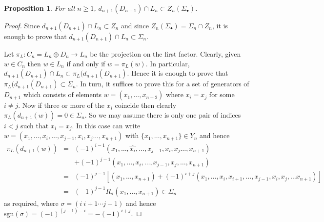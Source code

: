 \documentclass[12pt]{amsart}
\newtheorem{prop}[lem]{Proposition}
\theoremstyle{definition}
\newcommand{\<}{\langle}
\renewcommand{\>}{\rangle}
\newcommand{\sgn}[1]{\mathrm{sgn}(#1)}
\renewcommand{\sgn}[1]{\mathrm{sgn}(#1)}
\begin{document}
\begin{prop}\label{prop:symm} 
 For all $n\geq 1$, $d_{n+1}(D_{n+1})\cap L_n\subset Z_n(\Sigma_\bullet)$.
\end{prop}

\begin{proof} 
Since $d_{n+1}(D_{n+1})\cap L_n\subset Z_n$ and since $Z_n(\Sigma_\bullet)=\Sigma_n\cap Z_n$, it is enough to prove that $d_{n+1}(D_{n+1})\cap L_n\subset \Sigma_n$. 

Let $\pi_L:C_n=L_n\oplus D_n\to L_n$ be the projection on the first factor. Clearly, given $w\in C_n$ then $w\in L_n$ if and only if $w=\pi_L(w)$. In particular, 
$d_{n+1}(D_{n+1})\cap L_n\subset \pi_L(d_{n+1}(D_{n+1})$. Hence it is enough to prove that $\pi_L(d_{n+1}(D_{n+1})\subset \Sigma_n$. In turn, it suffices to  prove this for a set of generators of $D_{n+1}$ which consists of elements $w=(x_1,\ldots,x_{n+2})$ where $x_i=x_j$ for some $i\not=j$. Now if three or more of the $x_i$ coincide then clearly 
$\pi_L(d_{n+1}(w))=0\in \Sigma_n$. So we may assume there is only one pair of indices $i<j$ such that $x_i=x_j$. In this case can write $w=(x_1,\ldots,x_i,\ldots, x_{j-1},x_i,x_j\ldots,x_{n+1})$ with $\{x_1,\ldots,x_{n+1}\}\in Y_n$ and hence 
\begin{eqnarray*}
\pi_L(d_{n+1}(w))&=& (-1)^{i-1}(x_1,\ldots,\hat{x_i},\ldots, x_{j-1},x_i,x_j\ldots ,x_{n+1})\\
&&+ (-1)^{j-1}(x_1,\ldots, x_i,\ldots, x_{j-1},x_j,\ldots,x_{n+1})\\
&=&(-1)^{j-1}\left[(x_1,\ldots, x_{n+1})+(-1)^{i+j}(x_1,\ldots,x_i,x_{i+1},\ldots, x_{j-1},x_i,x_j,\ldots x_{n+1}) \right]\\
&=&(-1)^{j-1}R_\sigma(x_1,\ldots,x_{n+1})\in \Sigma_n 
\end{eqnarray*}
as required, where $\sigma=(i\ i+1\cdots j-1)$ and hence $\sgn{\sigma}=(-1)^{(j-1)-i}=-(-1)^{i+j}$. 

\end{proof}





\end{document}
